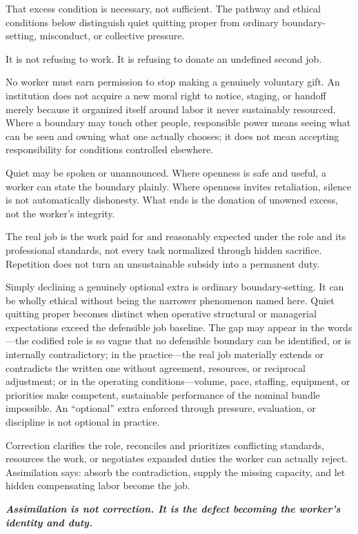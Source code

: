 \documentclass[11pt,oneside]{article}
\renewenvironment{quote}
  {\begin{tcolorbox}[
      enhanced,
      breakable,
      colback=ManifestLight,
      colframe=ManifestRule,
      boxrule=0pt,
      leftrule=3pt,
      arc=0pt,
      outer arc=0pt,
      left=10pt,right=10pt,top=8pt,bottom=8pt,
      before skip=0.8em,after skip=0.8em
    ]\itshape}
  {\end{tcolorbox}}
\begin{document}
That excess condition is necessary, not sufficient. The pathway and
ethical conditions below distinguish quiet quitting proper from ordinary
boundary-setting, misconduct, or collective pressure.

It is not refusing to work. It is refusing to donate an undefined second
job.

No worker must earn permission to stop making a genuinely voluntary
gift. An institution does not acquire a new moral right to notice,
staging, or handoff merely because it organized itself around labor it
never sustainably resourced. Where a boundary may touch other people,
responsible power means seeing what can be seen and owning what one
actually chooses; it does not mean accepting responsibility for
conditions controlled elsewhere.

Quiet may be spoken or unannounced. Where openness is safe and useful, a
worker can state the boundary plainly. Where openness invites
retaliation, silence is not automatically dishonesty. What ends is the
donation of unowned excess, not the worker's integrity.

The real job is the work paid for and reasonably expected under the role
and its professional standards, not every task normalized through hidden
sacrifice. Repetition does not turn an unsustainable subsidy into a
permanent duty.

Simply declining a genuinely optional extra is ordinary
boundary-setting. It can be wholly ethical without being the narrower
phenomenon named here. Quiet quitting proper becomes distinct when
operative structural or managerial expectations exceed the defensible
job baseline. The gap may appear in the words---the codified role is so
vague that no defensible boundary can be identified, or is internally
contradictory; in the practice---the real job materially extends or
contradicts the written one without agreement, resources, or reciprocal
adjustment; or in the operating conditions---volume, pace, staffing,
equipment, or priorities make competent, sustainable performance of the
nominal bundle impossible. An ``optional'' extra enforced through
pressure, evaluation, or discipline is not optional in practice.

Correction clarifies the role, reconciles and prioritizes conflicting
standards, resources the work, or negotiates expanded duties the worker
can actually reject. Assimilation says: absorb the contradiction, supply
the missing capacity, and let hidden compensating labor become the job.

\begin{quote}
\textbf{Assimilation is not correction. It is the defect becoming the
worker's identity and duty.}
\end{quote}
\end{document}
